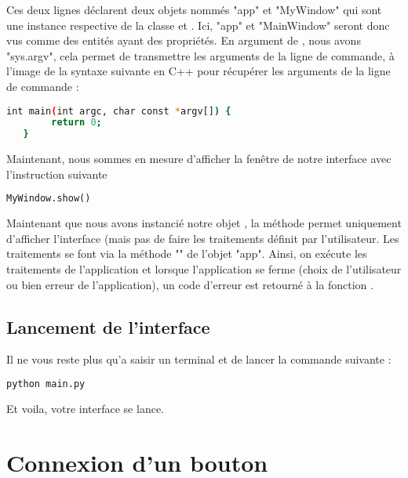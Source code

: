 {Ces deux lignes déclarent deux objets nommés "app" et "MyWindow" qui sont une instance respective de la classe  et . \newline
Ici, "app" et "MainWindow" seront donc vus comme des entités ayant des propriétés.\newline
En argument de , nous avons "sys.argv", cela permet de transmettre les arguments de la ligne de commande, à l'image de la syntaxe suivante en C++ pour récupérer les arguments de la ligne de commande : \newline\newline
\begin{lstlisting}[language=bash]
   int main(int argc, char const *argv[]) {
        return 0;
   }
\end{lstlisting}


Maintenant, nous sommes en mesure  d'afficher la fenêtre de notre interface avec l'instruction suivante

\begin{lstlisting}[language=Python]
	MyWindow.show()
\end{lstlisting}

Maintenant que nous avons instancié notre objet , la méthode  permet uniquement d'afficher l'interface (mais pas de faire les traitements définit par l'utilisateur. \newline
Les traitements se font via la méthode "" de l'objet "app".
Ainsi, on exécute les traitements de l'application et lorsque l'application se ferme (choix de l'utilisateur ou bien erreur de l'application), un code d'erreur est retourné à la fonction .

\subsection{Lancement de l'interface}

Il ne vous reste plus qu'a saisir un terminal et de lancer la commande suivante : 
\begin{lstlisting}[language=bash]
	python main.py
\end{lstlisting}


Et voila, votre interface se lance.



\section{Connexion d'un bouton}\label{exemple_signal}

}
